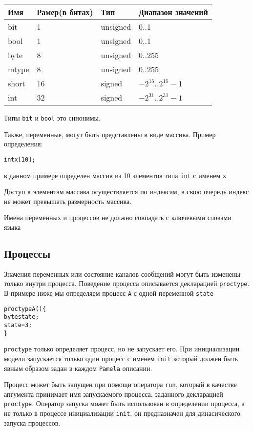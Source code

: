 \documentclass[12pt, twoside]{report}
\begin{document}
\begin{tabular}{l|l|l|l}
  \hline
  Имя   & Рамер(в битах) & Тип & Диапазон значений \\ \hline
  bit   & 1 & unsigned & 0..1 \\ \hline
  bool  & 1 & unsigned & 0..1 \\ \hline
  byte  & 8 & unsigned & 0..255 \\ \hline
  mtype & 8 & unsigned & 0..255 \\ \hline
  short & 16 & signed & $-2^15$..$2^15 - 1$ \\ \hline
  int   & 32 & signed & $-2^31$..$2^31 - 1$ \\ \hline
  \hline
\end{tabular}

Типы \texttt{bit} и \texttt{bool} это синонимы.

Также, переменные, могут быть представлены в виде массива. Пример определения:
\begin{alltt}
int x [10];
\end{alltt}
в данном примере определен массив из 10 элементов типа \texttt{int} с именем \texttt{x}

Доступ к элементам массива осуществляется по индексам, в свою очередь индекс не может
превышать размерность массива.

Имена переменных и процессов не должно совпадать с ключевыми словами языка 

\subsection*{Процессы}\label{promela_language_PROCESS}

Значения переменных или состояние каналов сообщений могут быть изменены только внутри процесса.
Поведение процесса описывается декларацией \texttt{proctype}. В примере ниже мы определяем процесс
\texttt{A} с одной переменной \texttt{state}
\begin{alltt}
proctype A() \{
  byte state;
  state = 3;
\}
\end{alltt}
\texttt{proctype} только определяет процесс, но не запускает его. При инициализации модели
запускается только один процесс с именем \texttt{init} который должен быть явным образом задан в
каждом \texttt{Pamela} описании.

Процесс может быть запущен при помощи оператора \texttt{run}, который в качестве апгумента принимает
имя запускаемого процесса, заданного декларацией \texttt{proctype}. Оператор запуска может быть использован в
определении процесса, а не только в процессе инициализации \texttt{init}, он предназначен для динасического
запуска процессов.
\end{document}
